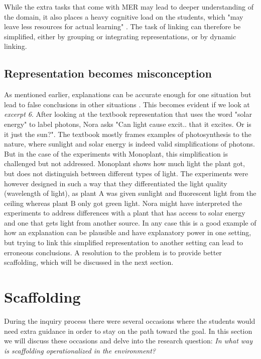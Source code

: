 While the extra tasks that come with MER may lead to deeper understanding of the domain, it also places a heavy cognitive load on the students, which "may leave less resources for actual learning" \citetext{Sweller, 1988, 1989, referenced in \citealp{van2006supporting}, p. 200}. The task of linking can therefore be simplified, either by grouping or integrating representations, or by dynamic linking. 

\subsection{Representation becomes misconception}
As mentioned earlier, explanations can be accurate enough for one situation but lead to false conclusions in other situations \citep{smith1994misconceptions}. This becomes evident if we look at \emph{excerpt 6}. After looking at the textbook representation that uses the word "solar energy" to label photons, Nora asks "Can light cause excit.. that it excites. Or is it just the sun?". The textbook mostly frames examples of photosynthesis to the nature, where sunlight and solar energy is indeed valid simplifications of photons. But in the case of the experiments with Monoplant, this simplification is challenged but not addressed. Monoplant shows how much light the plant got, but does not distinguish between different types of light. The experiments were however designed in such a way that they differentiated the light quality (wavelength of light), as plant A was given sunlight and fluorescent light from the ceiling whereas plant B only got green light. Nora might have interpreted the experiments to address differences with a plant that has access to solar energy and one that gets light from another source. In any case this is a good example of how an explanation can be plausible and have explanatory power in one setting, but trying to link this simplified representation to another setting can lead to erroneous conclusions. A resolution to the problem is to provide better scaffolding, which will be discussed in the next section.

\section{Scaffolding}
During the inquiry process there were several occasions where the students would need extra guidance in order to stay on the path toward the goal. In this section we will discuss these occasions and delve into the research question: \emph{In what way is scaffolding operationalized in the environment?}

